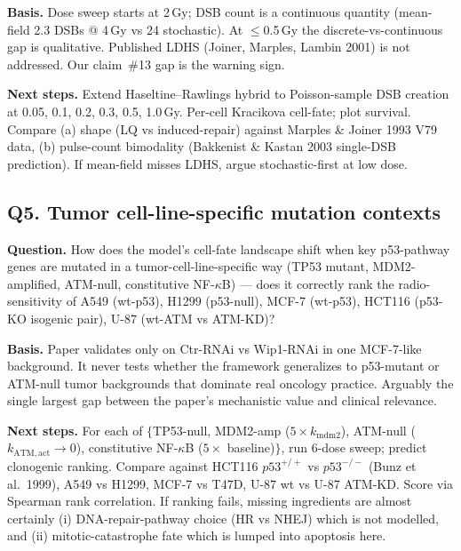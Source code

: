 \textbf{Basis.} Dose sweep starts at 2\,Gy; DSB count is a continuous
quantity (mean-field 2.3 DSBs @ 4\,Gy vs 24 stochastic). At $\leq$0.5\,Gy the
discrete-vs-continuous gap is qualitative. Published LDHS (Joiner, Marples,
Lambin 2001) is not addressed. Our claim~\#13 gap is the warning sign.

\textbf{Next steps.} Extend Haseltine--Rawlings hybrid to Poisson-sample DSB
creation at 0.05, 0.1, 0.2, 0.3, 0.5, 1.0\,Gy. Per-cell Kracikova cell-fate;
plot survival. Compare (a) shape (LQ vs induced-repair) against Marples \&
Joiner 1993 V79 data, (b) pulse-count bimodality (Bakkenist \& Kastan 2003
single-DSB prediction). If mean-field misses LDHS, argue stochastic-first at
low dose.

\subsection*{Q5. Tumor cell-line-specific mutation contexts}
\textbf{Question.} How does the model's cell-fate landscape shift when key
p53-pathway genes are mutated in a tumor-cell-line-specific way (TP53 mutant,
MDM2-amplified, ATM-null, constitutive NF-$\kappa$B) --- does it correctly
rank the radio-sensitivity of A549 (wt-p53), H1299 (p53-null), MCF-7
(wt-p53), HCT116 (p53-KO isogenic pair), U-87 (wt-ATM vs ATM-KD)?

\textbf{Basis.} Paper validates only on Ctr-RNAi vs Wip1-RNAi in one
MCF-7-like background. It never tests whether the framework generalizes to
p53-mutant or ATM-null tumor backgrounds that dominate real oncology practice.
Arguably the single largest gap between the paper's mechanistic value and
clinical relevance.

\textbf{Next steps.} For each of $\{$TP53-null, MDM2-amp ($5\times k_{\mathrm{mdm2}}$),
ATM-null ($k_{\mathrm{ATM,act}} \to 0$), constitutive NF-$\kappa$B ($5\times$
baseline)$\}$, run 6-dose sweep; predict clonogenic ranking. Compare against
HCT116 $p53^{+/+}$ vs $p53^{-/-}$ (Bunz et al.\ 1999), A549 vs H1299, MCF-7
vs T47D, U-87 wt vs U-87 ATM-KD. Score via Spearman rank correlation. If
ranking fails, missing ingredients are almost certainly (i) DNA-repair-pathway
choice (HR vs NHEJ) which is not modelled, and (ii) mitotic-catastrophe fate
which is lumped into apoptosis here.

